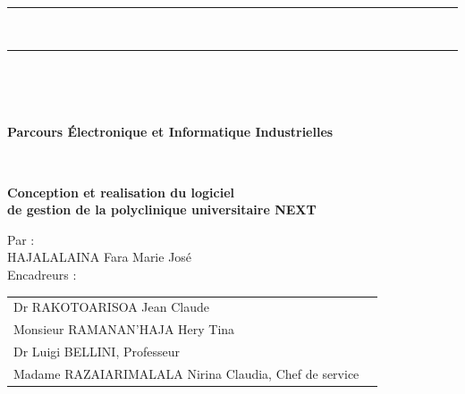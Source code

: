 \documentclass[12pt,a4paper]{report}
\begin{document}
\begin{titlepage}
{\begin{center}
 		\end{center}			
 	}\\
 	\vspace*{-0.7 cm}
 	\centering\parbox{\textwidth}{
 		\begin{center}
 			\color{black}\rule{\textwidth}{0.5pt}\\
 			\vspace*{-0.38 cm}
 			\rule{\textwidth}{1.5pt}\\	
 		\end{center}			
 	}\\
 	\centering\parbox{\textwidth}{
 		\begin{center}		
 			\large\textbf{Parcours Électronique et Informatique Industrielles} \\			
 		\end{center}			
 	}\\
 	\vfill
 	\parbox{\textwidth}{
 		\begin{center}
 			{\Huge \color[rgb]{0,0,1} \bfseries{Conception et  realisation du  logiciel }} \\	
 			\vspace{0.3 cm}
 			{\Huge \color[rgb]{0,0,1} \bfseries{de gestion de la polyclinique universitaire NEXT }} \\
 		\end{center}
 	}
 	\vfill
 	
 	\parbox{\textwidth}{
 		\begin{center}
 			\large{Par :}  \\
 			\vspace{0.3 cm}
 			\large{HAJALALAINA Fara Marie José} \\
 			\vspace*{0.5 cm}
 			\large{Encadreurs :}\\
 			\vspace{0.3 cm}
 			\begin{tabular}{ll}
 				\normalsize Dr RAKOTOARISOA Jean Claude \\
 				\normalsize Monsieur RAMANAN'HAJA Hery Tina \\
 				\normalsize	Dr Luigi BELLINI, Professeur\\
 				\normalsize Madame	RAZAIARIMALALA Nirina Claudia, Chef de service\\			
 			\end{tabular}
 			

\end{center}}
\end{titlepage}
\end{document}
